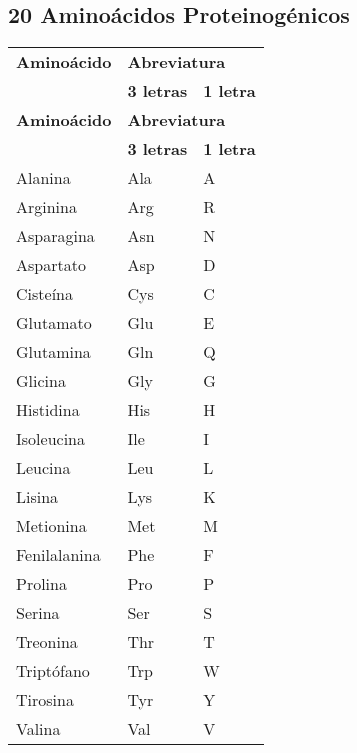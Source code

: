 \subsection*{20 Amino\'{a}cidos Proteinog\'{e}nicos} 
\begin{longtable}[l]{lll}
   \textbf{Amino\'{a}cido} & \multicolumn{2}{l}{\textbf{Abreviatura}} \\
  \cline{2-3}
  &\textbf{3 letras}&\textbf{1 letra}\\[0.5ex] \hline%
  \endfirsthead%
 \textbf{Amino\'{a}cido} & \multicolumn{2}{l}{\textbf{Abreviatura}} \\
  \cline{2-3}
  &\textbf{3 letras}&\textbf{1 letra}\\[0.5ex] \hline%
 \endhead%
\renewcommand{\arraystretch}{1.4}\label{amino}
Alanina&Ala&A\\
Arginina&Arg&R\\
Asparagina&Asn&N\\
Aspartato&Asp&D\\
Ciste\'{i}na&Cys&C\\
Glutamato&Glu&E\\
Glutamina&Gln&Q\\
Glicina&Gly&G\\
Histidina&His&H\\
Isoleucina&Ile&I\\
Leucina&Leu&L\\
Lisina&Lys&K\\
Metionina&Met&M\\
Fenilalanina&Phe&F\\
Prolina&Pro&P\\
Serina&Ser&S\\
Treonina&Thr&T\\
Tript\'{o}fano&Trp&W\\
Tirosina&Tyr&Y\\
Valina&Val&V\\ \hline
\end{longtable}


\setlength{\extrarowheight}{0pt}